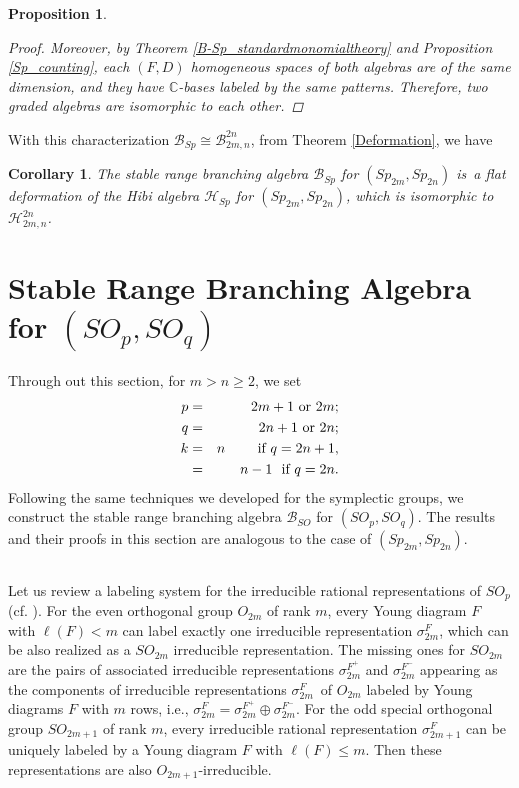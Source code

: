 \documentclass[11pt]{amsart}
\numberwithin{equation}{subsection}
\newtheorem{corollary}[theorem]{Corollary}
\newtheorem{proposition}[theorem]{Proposition}
\begin{document}
\begin{proposition}
\begin{proof}
Moreover, by Theorem \ref{B-Sp_standardmonomialtheory} and Proposition \ref{Sp_counting}, 
each $(F,D)$ homogeneous spaces of both algebras are of the same dimension, and
they have $\mathbb{C}$-bases labeled by the same patterns.
Therefore, two graded algebras are isomorphic to each other.
\end{proof}
\end{proposition}


With this characterization $\mathcal{B}_{{Sp}} \cong \mathcal{B}_{2m,n}^{2n}$, 
from Theorem \ref{Deformation}, we have

\begin{corollary}
The stable range branching algebra $\mathcal{B}_{{Sp}}$ for 
$({Sp}_{2m},{Sp}_{2n})$ is\ a flat deformation of the Hibi algebra 
$\mathcal{H}_{Sp}$ for $({Sp}_{2m},{Sp}_{2n})$, which is isomorphic 
to $\mathcal{H}_{2m,n}^{2n}$.
\end{corollary}

\medskip



\section{Stable Range Branching Algebra for $({SO}_{p},{SO}_{q})$}


Through out this section, for $m>n\geq 2$, we set
\begin{eqnarray*}
p &=& 2m+1 \hbox{ or } 2m; \\
q &=& 2n+1 \hbox{ or } 2n; \\
k &=& n    \hbox{\ \ \ \ \ \ \  if } q=2n+1, \\
  &=& n-1  \hbox{\ \  if } q=2n. 
\end{eqnarray*}
Following the same techniques we developed for the
symplectic groups, we construct the stable range branching algebra 
$\mathcal{B}_{{SO}}$ for $({SO}_{p},{SO}_{q})$. The results and their proofs 
in this section are analogous to the case of $({Sp}_{2m},{Sp}_{2n})$.

\subsection{}

Let us review a labeling system for the irreducible rational representations
of ${SO}_{p}$ (cf. \cite[\S 3.1.4]{GW09}). For the even orthogonal group ${O}_{2m}$ 
of rank $m$, every Young diagram $F$ with $\ell (F)<m$ can label exactly one irreducible
representation $\sigma _{2m}^{F}$, which can be also realized as a 
${SO}_{2m}$ irreducible representation. The missing ones for ${SO}_{2m}$ are the
pairs of associated irreducible representations $\sigma _{2m}^{F^{+}}$ and 
$\sigma _{2m}^{F^{-}}$ appearing as the components of irreducible
representations $\sigma _{2m}^{F}$\ of $O_{2m}$ labeled by Young diagrams 
$F$ with $m$ rows, i.e., 
$\sigma _{2m}^{F}=\sigma _{2m}^{F^{+}}\oplus \sigma_{2m}^{F^{-}}$. For the odd 
special orthogonal group ${SO}_{2m+1}$ of rank $m$, every irreducible rational 
representation $\sigma _{2m+1}^{F}$ can be uniquely labeled by a Young diagram 
$F$ with $\ell (F)\leq m$. Then these representations are also ${O}_{2m+1}$-irreducible.
\end{document}
